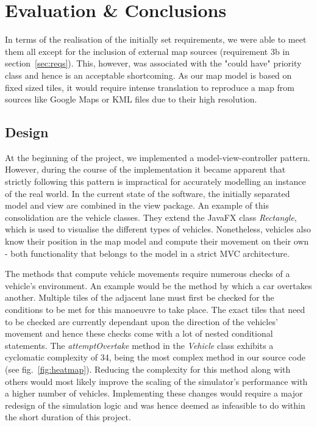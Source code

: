 \section{Evaluation \& Conclusions}
\label{ss:eval_sim}
In terms of the realisation of the initially set requirements, we were able to meet them all except for the inclusion of external map sources (requirement 3b in section~\ref{sec:reqs}). This, however, was associated with the "could have" priority class and hence is an acceptable shortcoming. As our map model is based on fixed sized tiles, it would require intense translation to reproduce a map from sources like Google Maps or KML files due to their high resolution. 

\subsection*{Design}
At the beginning of the project, we implemented a model-view-controller pattern. However, during the course of the implementation it became apparent that strictly following this pattern is impractical for accurately modelling an instance of the real world. In the current state of the software, the initially separated model and view are combined in the view package. An example of this consolidation are the vehicle classes. They extend the JavaFX class \textit{Rectangle}, which is used to visualise the different types of vehicles. Nonetheless, vehicles also know their position in the map model and compute their movement on their own - both functionality that belongs to the model in a strict MVC architecture.

The methods that compute vehicle movements require numerous checks of a vehicle's environment. An example would be the method by which a car overtakes another. Multiple tiles of the adjacent lane must first be checked for the conditions to be met for this manoeuvre to take place. The exact tiles that need to be checked are currently dependant upon the direction of the vehicles' movement and hence these checks come with a lot of nested conditional statements. The \textit{attemptOvertake} method in the \textit{Vehicle} class exhibits a cyclomatic complexity of 34, being the most complex method in our source code (see fig.~\ref{fig:heatmap}). Reducing the complexity for this method along with others would most likely improve the scaling of the simulator's performance with a higher number of vehicles. Implementing these changes would require a major redesign of the simulation logic and was hence deemed as infeasible to do within the short duration of this project.

